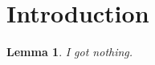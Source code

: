 \documentclass{article}
\newtheorem{lemma}{Lemma}[section]
\begin{document}
\section{Introduction}

\begin{lemma}
I got nothing.
\end{lemma}
\end{document}
